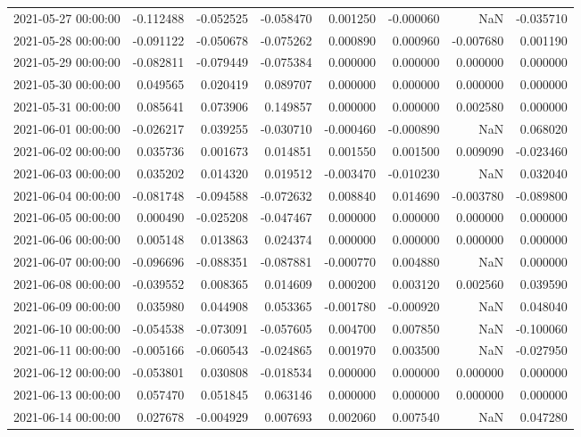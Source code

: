 \begin{tabular}{lrrrrrrr}
2021-05-27 00:00:00 & -0.112488 & -0.052525 & -0.058470 & 0.001250 & -0.000060 & NaN & -0.035710 \\
2021-05-28 00:00:00 & -0.091122 & -0.050678 & -0.075262 & 0.000890 & 0.000960 & -0.007680 & 0.001190 \\
2021-05-29 00:00:00 & -0.082811 & -0.079449 & -0.075384 & 0.000000 & 0.000000 & 0.000000 & 0.000000 \\
2021-05-30 00:00:00 & 0.049565 & 0.020419 & 0.089707 & 0.000000 & 0.000000 & 0.000000 & 0.000000 \\
2021-05-31 00:00:00 & 0.085641 & 0.073906 & 0.149857 & 0.000000 & 0.000000 & 0.002580 & 0.000000 \\
2021-06-01 00:00:00 & -0.026217 & 0.039255 & -0.030710 & -0.000460 & -0.000890 & NaN & 0.068020 \\
2021-06-02 00:00:00 & 0.035736 & 0.001673 & 0.014851 & 0.001550 & 0.001500 & 0.009090 & -0.023460 \\
2021-06-03 00:00:00 & 0.035202 & 0.014320 & 0.019512 & -0.003470 & -0.010230 & NaN & 0.032040 \\
2021-06-04 00:00:00 & -0.081748 & -0.094588 & -0.072632 & 0.008840 & 0.014690 & -0.003780 & -0.089800 \\
2021-06-05 00:00:00 & 0.000490 & -0.025208 & -0.047467 & 0.000000 & 0.000000 & 0.000000 & 0.000000 \\
2021-06-06 00:00:00 & 0.005148 & 0.013863 & 0.024374 & 0.000000 & 0.000000 & 0.000000 & 0.000000 \\
2021-06-07 00:00:00 & -0.096696 & -0.088351 & -0.087881 & -0.000770 & 0.004880 & NaN & 0.000000 \\
2021-06-08 00:00:00 & -0.039552 & 0.008365 & 0.014609 & 0.000200 & 0.003120 & 0.002560 & 0.039590 \\
2021-06-09 00:00:00 & 0.035980 & 0.044908 & 0.053365 & -0.001780 & -0.000920 & NaN & 0.048040 \\
2021-06-10 00:00:00 & -0.054538 & -0.073091 & -0.057605 & 0.004700 & 0.007850 & NaN & -0.100060 \\
2021-06-11 00:00:00 & -0.005166 & -0.060543 & -0.024865 & 0.001970 & 0.003500 & NaN & -0.027950 \\
2021-06-12 00:00:00 & -0.053801 & 0.030808 & -0.018534 & 0.000000 & 0.000000 & 0.000000 & 0.000000 \\
2021-06-13 00:00:00 & 0.057470 & 0.051845 & 0.063146 & 0.000000 & 0.000000 & 0.000000 & 0.000000 \\
2021-06-14 00:00:00 & 0.027678 & -0.004929 & 0.007693 & 0.002060 & 0.007540 & NaN & 0.047280 \\

\end{tabular}
